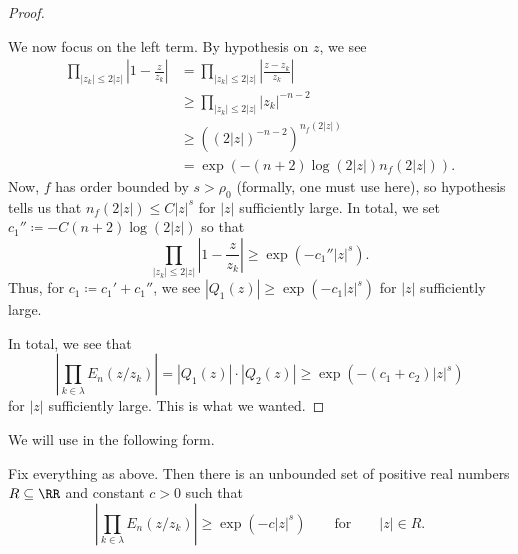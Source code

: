 \documentclass[notes.tex]{subfiles}
\begin{document}
\begin{proof}
\begin{itemize}
		We now focus on the left term. By hypothesis on $z$, we see
		\begin{align*}
			\prod_{|z_k|\le2|z|}\left|1-\frac z{z_k}\right| &= \prod_{|z_k|\le2|z|}\left|\frac{z-z_k}{z_k}\right| \\
			&\ge \prod_{|z_k|\le2|z|}|z_k|^{-n-2} \\
			&\ge \left((2|z|)^{-n-2}\right)^{n_f(2|z|)} \\
			&= \exp\left(-(n+2)\log(2|z|)n_f(2|z|)\right).
		\end{align*}
		Now, $f$ has order bounded by $s>\rho_0$ (formally, one must use  here), so hypothesis tells us that $n_f(2|z|)\le C|z|^s$ for $|z|$ sufficiently large. In total, we set $c_1''\coloneqq-C(n+2)\log(2|z|)$ so that
		\[\prod_{|z_k|\le2|z|}\left|1-\frac z{z_k}\right|\ge\exp\left(-c_1''|z|^s\right).\]
		Thus, for $c_1\coloneqq c_1'+c_1''$, we see $|Q_1(z)|\ge\exp\left(-c_1|z|^s\right)$ for $|z|$ sufficiently large.
	\end{itemize}
	In total, we see that
	\[\left|\prod_{k\in\lambda} E_n(z/z_k)\right|=|Q_1(z)|\cdot|Q_2(z)|\ge\exp\left(-(c_1+c_2)|z|^s\right)\]
	for $|z|$ sufficiently large. This is what we wanted.
\end{proof}
We will use  in the following form.
\begin{lemma} \label{lem:better-elem-prod-lower-bound}
	Fix everything as above. Then there is an unbounded set of positive real numbers $R\subseteq\RR$ and constant $c>0$ such that
	\[\left|\prod_{k\in\lambda} E_n(z/z_k)\right|\ge\exp\left(-c|z|^s\right)\qquad\text{for}\qquad|z|\in R.\]
\end{lemma}
\end{document}

